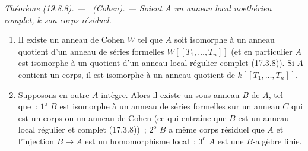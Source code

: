 \documentclass[10pt,oneside]{book}
\makeatletter
\newcommand{\setmanualcurrentlabel}[1]{\def\@currentlabel{#1}}
\newcommand{\oldpage}[2][]{%
  \setcounter{footnote}{0}%
  \marginpar{\scriptsize\textbf{#1}~|~#2}\ignorespaces}
\newenvironment{theorem}[1][]{%
  \setmanualcurrentlabel{#1}\par\medskip\noindent\itshape Théorème (#1). ---\ }{\par}
\makeatother
\begin{document}
\begin{theorem}[19.8.8]
\label{0.19.8.8-fr}
\textup{(Cohen).} --- Soient $A$ un anneau local noethérien complet, $k$ son
corps résiduel.

\oldpage[0\textsubscript{IV-1}]{112}

\begin{enumerate}
  \item[(i)] Il existe un anneau de Cohen $W$ tel que $A$ soit isomorphe à un
  anneau quotient d'un anneau de séries formelles
  $W[[T_1,\ldots,T_n]]$ (et en particulier $A$ est isomorphe à un quotient d'un
  anneau local régulier complet (17.3.8)). Si $A$ contient un corps, il est
  isomorphe à un anneau quotient de $k[[T_1,\ldots,T_n]]$.
  \item[(ii)] Supposons en outre $A$ intègre. Alors il existe un sous-anneau
  $B$ de $A$, tel que~: $1^{\mathrm o}$ $B$ est isomorphe à un anneau de séries
  formelles sur un anneau $C$ qui est un corps ou un anneau de Cohen (ce qui
  entraîne que $B$ est un anneau local régulier et complet (17.3.8))~;
  $2^{\mathrm o}$ $B$ a même corps résiduel que $A$ et l'injection $B\to A$ est
  un homomorphisme local~; $3^{\mathrm o}$ $A$ est une $B$-algèbre finie.
\end{enumerate}
\end{theorem}
\end{document}
